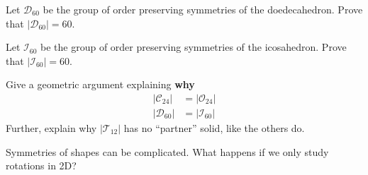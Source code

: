 \documentclass{ximera}
\begin{document}
\begin{exercise}\label{E:symdoe}
  Let $\mathcal{D}_{60}$ be the group of order preserving symmetries of the
  doedecahedron. Prove that $|\mathcal{D}_{60}|=60$.
\end{exercise}

\begin{exercise}\label{E:symicos}
  Let $\mathcal{I}_{60}$ be the group of order preserving symmetries of the
  icosahedron. Prove that $|\mathcal{I}_{60}|=60$.
\end{exercise}

\begin{exercise}
  Give a geometric argument explaining \textbf{why}
  \begin{align*}
    |\mathcal{C}_{24}| &= |\mathcal{O}_{24}|\\
    |\mathcal{D}_{60}| &= |\mathcal{I}_{60}|
  \end{align*}
  Further, explain why $|\mathcal{T}_{12}|$ has no ``partner'' solid,
  like the others do.
\end{exercise}









\begin{question}
  Symmetries of shapes can be complicated. What happens if we only
  study rotations in 2D?
\end{question}
\end{document}
